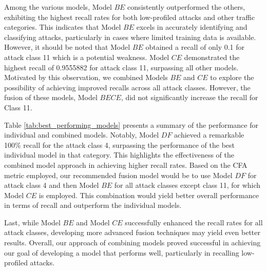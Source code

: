 
Among the various models, Model $BE$ consistently outperformed the others, exhibiting the highest recall rates for both low-profiled attacks and other traffic categories. This indicates that Model $BE$ excels in accurately identifying and classifying attacks, particularly in cases where limited training data is available. However, it should be noted that Model $BE$ obtained a recall of only 0.1 for attack class 11 which is a potential weakness. Model $CE$ demonstrated the highest recall of 0.9555882 for attack class 11, surpassing all other models. Motivated by this observation, we combined Models $BE$ and $CE$ to explore the possibility of achieving improved recalls across all attack classes. However, the fusion of these models, Model $BECE$, did not significantly increase the recall for Class 11. 

Table \ref{tab:best_performing_models} presents a summary of the performance for individual and combined models. Notably, Model $DF$ achieved a remarkable 100\% recall for the attack class 4, surpassing the performance of the best individual model in that category. This highlights the effectiveness of the combined model approach in achieving higher recall rates. Based on the CFA metric employed, our recommended fusion model would be to use Model $DF$ for attack class 4 and then Model $BE$ for all attack classes except class 11, for which Model $CE$ is employed. This combination would yield better overall performance in terms of recall and outperform the individual models. %

Last, while Model $BE$ and Model $CE$ successfully enhanced the recall rates for all attack classes, developing more advanced fusion techniques may yield even better results. Overall, our approach of combining models proved successful in achieving our goal of developing a model that performs well, particularly in recalling low-profiled attacks.


